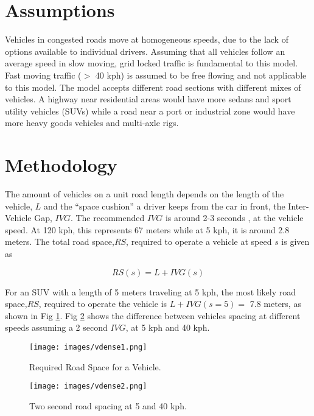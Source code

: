 \section{Assumptions}
Vehicles in congested roads move at homogeneous speeds, due to the lack of options available to individual drivers.  Assuming that all vehicles follow an average speed in slow moving, grid locked traffic is fundamental to this model.  Fast moving traffic ($>$ 40 kph) is assumed to be free flowing and not applicable to this model.  
The model accepts different road sections with different mixes of vehicles.  A highway near residential areas would have more sedans and sport utility vehicles (SUVs) while a road near a port or industrial zone would have more heavy goods vehicles and multi-axle rigs.

\section{Methodology}
The amount of vehicles on a unit road length depends on the length of the vehicle, $L$ and the ``space cushion” a driver keeps from the car in front, the Inter-Vehicle Gap, $IVG$.  The recommended $IVG$ is around 2-3 seconds ,  at the vehicle speed.  At 120 kph, this represents 67 meters while at 5 kph, it is around 2.8 meters.  The total road space,$RS$, required to operate a vehicle at speed $s$ is given as

\begin{equation}
\label{eq1:roadspace}
RS(s)=L +IVG(s)
\end{equation}

For an SUV with a length of 5 meters traveling at 5 kph, the most likely road space,$RS$, required to operate the vehicle is $L + IVG(s=5) =$ 7.8 meters, as shown in Fig \ref{fig1:roadspace}.  Fig \ref{fig2:2secroadspace} shows the difference between vehicles spacing at different speeds assuming a 2 second $IVG$, at 5 kph and 40 kph.
%
\begin{figure}
\texttt{[image: images/vdense1.png]} 
\caption{Required Road Space for a Vehicle.}
\label{fig1:roadspace}
\end{figure}
%

%
\begin{figure}
\texttt{[image: images/vdense2.png]} 
\caption{Two second road spacing at 5 and 40 kph.}
\label{fig2:2secroadspace}
\end{figure}
%

